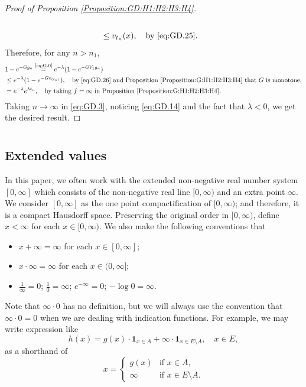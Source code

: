 \documentclass[12pt,a4paper]{amsart}
\numberwithin{equation}{section}
\theoremstyle{plain}
\theoremstyle{definition}
\theoremstyle{remark}
\newcounter{N}
\newcounter{n}[N]
\begin{document}
\begin{proof}[Proof of Proposition \ref{Proposition:GD:H1:H2:H3:H4}]
\begin{align}
\\\label{eq:GD.26} & \leq v_{t_n}(x),\quad\text{by \eqref{eq:GD.25}}.\end{align}
Therefore, for any $n>n_1$, 
\begin{align}
& 1 - e^{- Gg_n}
\overset{\text{\eqref{eq:G.0}}}= e^{- \lambda} (1- e^{- GV_1g_n})
\\&\leq e^{- \lambda} (1- e^{- G v_{(t_n)}}) ,\quad\text{by \eqref{eq:GD.26} and Proposition \ref{Proposition:G:H1:H2:H3:H4} that $G$ is monotone},
\\\label{eq:GD.3}&= e^{- \lambda} e^{\lambda t_n},\quad\text{by taking $f = \infty$ in Proposition \ref{Proposition:G:H1:H2:H3:H4}}.
\end{align} 
Taking $n\to \infty$ in \eqref{eq:GD.3}, noticing \eqref{eq:GD.14} and the fact that $\lambda < 0$, we get the desired result.
\end{proof}

\appendix
\section{}
\subsection{Extended values}
\label{sec:EV}
In this paper, we often work with the extended non-negative real number system $[0,\infty]$ which consists of the non-negative real line $[0,\infty)$ and an extra point $\infty$. 
We consider $[0,\infty]$ as the one point compactification of $[0,\infty)$; and therefore, it is a compact Hausdorff space.
Preserving the original order in $[0,\infty)$, define $x < \infty$ for each $x\in [0,\infty)$.
We also make the following conventions that 
\begin{itemize}
\item
$x + \infty = \infty$ for each $x\in [0,\infty]$; 
\item
$x \cdot \infty = \infty$ for each $x\in (0,\infty]$;
\item
$\frac{1}{\infty} = 0$; $\frac{1}{0} = \infty$; $e^{-\infty} =0$; $-\log 0 = \infty$.
\end{itemize}
Note that $ \infty \cdot 0$ has no definition, but we will always use the convention that $\infty \cdot 0 = 0$ when we are dealing with indication functions. 
For example, we may write expression like
\begin{equation} 
h(x) = g(x) \cdot \mathbf 1_{x\in A} + \infty \cdot \mathbf 1_{x \in E\setminus A}, \quad x\in E,
\end{equation}
as a shorthand of 
\begin{equation}
x = \begin{cases}
g(x) & \text{if $x\in A$},
\\ \infty & \text{if $x\in E\setminus A$}.
\end{cases}
\end{equation}
\end{document}
